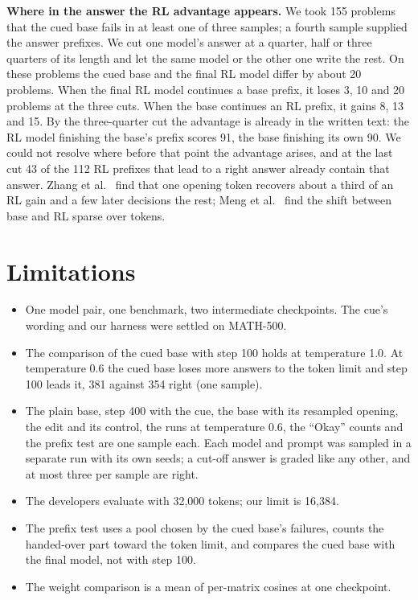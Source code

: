 \documentclass[10pt]{article}
\begin{document}
\textbf{Where in the answer the RL advantage appears.} We took 155 problems that the cued base fails in at least
one of three samples; a fourth sample supplied the answer prefixes. We cut one model's answer at a quarter, half or
three quarters of its length and let the same model or the other one write the rest. On these problems the cued
base and the final RL model differ by about 20 problems. When the final RL model continues a base prefix, it loses
3, 10 and 20 problems at the three cuts. When the base continues an RL prefix, it gains 8, 13 and 15. By the
three-quarter cut the advantage is already in the written text: the RL model finishing the base's prefix scores
91, the base finishing its own 90. We could not resolve where before that point the advantage arises, and at the
last cut 43 of the 112 RL prefixes that lead to a right answer already contain that answer. Zhang et al.\ \cite{zhang2026what} find
that one opening token recovers about a third of an RL gain and a few later decisions the rest; Meng et al.\
\cite{meng2026sparse} find the shift between base and RL sparse over tokens.

\section{Limitations}

\begin{itemize}
\item One model pair, one benchmark, two intermediate checkpoints. The cue's wording and our harness were settled
on MATH-500.
\item The comparison of the cued base with step 100 holds at temperature 1.0. At temperature 0.6 the cued base
loses more answers to the token limit and step 100 leads it, 381 against 354 right (one sample).
\item The plain base, step 400 with the cue, the base with its resampled opening, the edit and its control,
the runs at temperature 0.6, the ``Okay'' counts and the prefix test are one sample each.
Each model and prompt was sampled in a separate run with its own seeds; a cut-off answer is graded like any other, and at most
three per sample are right.
\item The developers evaluate with 32{,}000 tokens; our limit is 16{,}384.
\item The prefix test uses a pool chosen by the cued base's failures, counts the handed-over part toward the token
limit, and compares the cued base with the final model, not with step 100.
\item The weight comparison is a mean of per-matrix cosines at one checkpoint.
\end{itemize}
\end{document}
